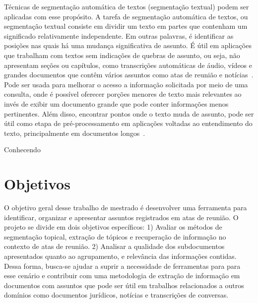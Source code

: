 

Técnicas de segmentação automática de textos (segmentação textual) podem ser aplicadas com esse propósito. A tarefa de segmentação automática de textos, ou segmentação textual consiste em dividir um texto em partes que contenham um significado relativamente independente. Em outras palavras, é identificar as posições nas quais há uma mudança significativa de assunto. É útil em aplicações que trabalham com textos sem indicações de quebras de assunto, ou seja, não apresentam seções ou capítulos, como transcrições automáticas de áudio, vídeos e grandes documentos que contêm vários assuntos como atas de reunião e notícias~\cite{ Bokaei2015, Sakahara2014, Misra2009, Eisenstein2008, Choi2000}.
Pode ser usada para melhorar o acesso a informação solicitada por meio de uma consulta, onde é possível oferecer porções menores de texto mais relevantes ao invés de exibir um documento grande que pode conter informações menos pertinentes.  Além disso, encontrar pontos onde o texto muda de assunto, pode ser útil como etapa de pré-processamento em aplicações voltadas ao entendimento do texto, principalmente em documentos longos~\cite{Choi2000}.











Conhecendo 












\section{Objetivos}


O objetivo geral desse trabalho de mestrado é desenvolver uma ferramenta para identificar, organizar e apresentar assuntos registrados em atas de reunião. O projeto se divide em dois objetivos específicos: 1) Avaliar os métodos de segmentação topical, extração de tópicos e recuperação de informação no contexto de atas de reunião. 2) Analisar a qualidade dos subdocumentos apresentados quanto ao agrupamento, e relevância das informações contidas.
Dessa forma, busca-se ajudar a suprir a necessidade de ferramentas para para esse cenário e contribuir com uma metodologia de extração de informação em documentos com assuntos que pode ser útil em trabalhos relacionados a outros domínios como documentos jurídicos, notícias e transcrições de conversas.


